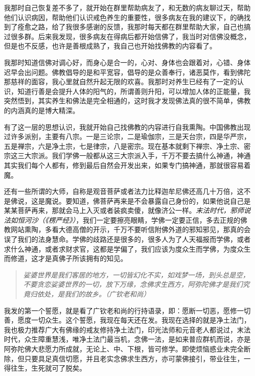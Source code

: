 我那时自己恢复差不多了，就开始在群里帮助病友了，和无数的病友聊过天，帮助他们认识病因，帮助他们认识戒色养生的重要性，很多病友在我的建议下，的确找到了痊愈之路，给了我很多感谢的反馈，我那时每天都在群里帮助大家，自己也搞过很多群。后来我发现，很多病友在得病后都开始信佛了，我当时对信佛没概念，但是也不反感，也许是善根成熟了，我自己也开始找佛教的内容看了。

我那时知道信佛对调心好，而身心是合一的，心对、身体也会跟着对，心错、身体迟早会出问题。佛教倡导的是和平宽容，倡导的是众善奉行，诸恶莫作，看到佛陀那慈祥的面容，我心里就自然升起无限的欢喜。我那时对养生已经有了一定的认识，知道行善是会提升人体的阳气的，所谓善则升阳，可以增加人体的正能量，我突然悟到，其实养生和佛法是完全相通的，这时我才发现佛法真的很不简单，佛教的内涵真的是博大精深。

有了这一层的思想认识，我就开始自己找佛教的内容进行自我熏陶。中国佛教出现过许多派别，主要有八宗。一是三论宗，二是瑜伽宗，三是天台宗，四是华严宗，五是禅宗，六是净土宗，七是律宗，八是密宗。现在基本就剩下禅宗、净土宗、密宗这三大宗派。我们学佛一般都从这三大宗派入手，千万不要去搞什么神通，神通其实我们每个人都有，修到最后自然会开发出来，如果专门搞神通，那就很容易着魔。

还有一些所谓的大师，自称是观音菩萨或者法力比释迦牟尼佛还高几十万倍，这不是佛说，这是魔说。要知道，佛菩萨再来是不会暴露自己身份的，如果他说自己是某某菩萨再来，那就会马上入灭或者装疯卖傻，就像济公一样。\textit{末法时代，邪师说法如恒河沙（《楞严经》）}，我们一定要擦亮眼睛，学佛一定要正信，多去正规的佛教网站熏陶，多看大德高僧的开示，千万不要听信附佛外道的邪知邪见，那真的会误了我们的法身慧命。学佛的歧路还是很多的，很多人为了人天福报而学佛，或者求什么神通，或者求财求官，这都是学偏了，我们应该为度众生而学佛，为度众生而修道，这才是真佛子所该拥有的知见。

\begin{quote}\it
    娑婆世界是我们客居的地方，一切皆幻化不实，如戏梦一场，到头总是空，不要贪恋娑婆世界的一切，放下万缘，念佛求生西方，阿弥陀佛才是我们究竟归依处，是我们的故乡。（广钦老和尚）
\end{quote}

我发的第一个誓愿，就是看了广钦老和尚的行持语录，即：愿断一切恶，愿修一切善，愿度一切众生。这个誓愿，我现在每天还在发。我现在选择的就是净土法门，我也极力推荐广大有佛缘的戒友修持净土法门，印光法师和元音老人都说过，末法时代，众生障重慧浅，唯净土法门最当机，念佛一法，是如来普应群机而说，亦是阿弥陀佛大悲愿力所成就，无论上、中、下根，皆可修学。即使烦恼惑业未完全断除，但只要具足真信切愿，并且老实念佛求生西方，亦可蒙佛接引，带业往生，一得往生，生死就可了脱矣。


